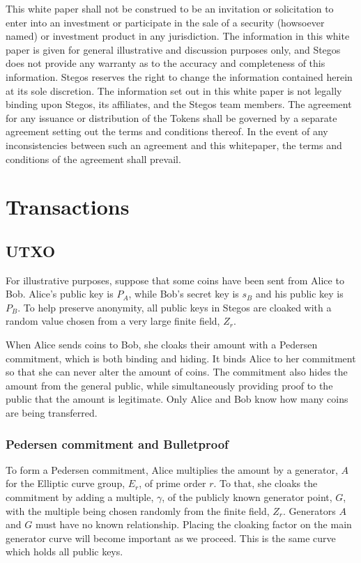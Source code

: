 \documentclass[8pt,fleqn,openany]{book}
\begin{document}
This white paper shall not be construed to be an invitation or solicitation to enter into an investment or participate in the sale of a security (howsoever named) or investment product in any jurisdiction. The information in this white paper is given for general illustrative and discussion purposes only, and Stegos does not provide any warranty as to the accuracy and completeness of this information. Stegos reserves the right to change the information contained herein at its sole discretion. The information set out in this white paper is not legally binding upon Stegos, its affiliates, and the Stegos team members. The agreement for any issuance or distribution of the Tokens shall be governed by a separate agreement setting out the terms and conditions thereof. In the event of any inconsistencies between such an agreement and this whitepaper, the terms and conditions of the agreement shall prevail. 

\newpage \appendix
{}

\chapter{Transactions}

\section{UTXO}
For illustrative purposes, suppose that some coins have been sent from Alice to Bob. Alice’s public key is $P_A$, while Bob’s secret key is $s_B$ and his public key is $P_B$. To help preserve anonymity, all public keys in Stegos are cloaked with a random value chosen from a very large finite field, $Z_r$.

When Alice sends coins to Bob, she cloaks their amount with a Pedersen commitment, which is both binding and hiding. It binds Alice to her commitment so that she can never alter the amount of coins. The commitment also hides the amount from the general public, while simultaneously providing proof to the public that the amount is legitimate. Only Alice and Bob know how many coins are being transferred. 

\subsection{Pedersen commitment and Bulletproof} To form a Pedersen commitment, Alice multiplies the amount by a generator, $A$ for the Elliptic curve group, $E_r$, of prime order $r$. To that, she cloaks the commitment by adding a multiple, $\gamma$, of the publicly known generator point, $G$, with the multiple being chosen randomly from the finite field, $Z_r$. Generators $A$ and $G$ must have no known relationship. Placing the cloaking factor on the main generator curve will become important as we proceed. This is the same curve which holds all public keys. 
\end{document}
